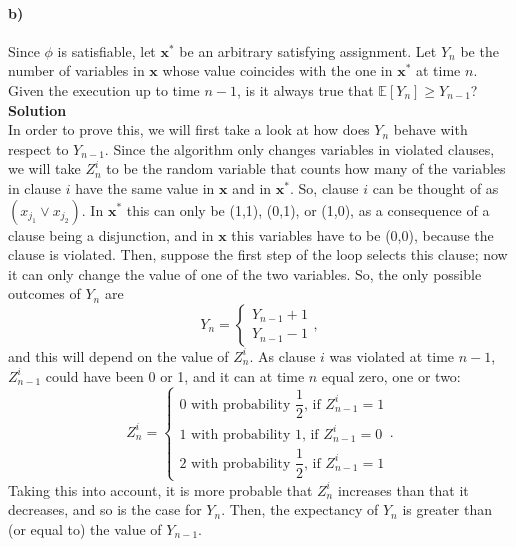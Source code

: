 \documentclass[10pt]{article}
\begin{document}
\paragraph{b)} Since $\phi$ is satisfiable, let $\textbf{x}^*$ be an arbitrary satisfying assignment. Let $Y_n$ be the number of variables in $\textbf{x}$ whose value coincides with the one in $\textbf{x}^*$ at time $n$. Given the execution up to time $n-1$, is it always true that $\mathbb{E}\left[Y_n\right]\geq Y_{n-1}$?\\
\textbf{Solution}\\
In order to prove this, we will first take a look at how does $Y_n$ behave with respect to $Y_{n-1}$. Since the algorithm only changes variables in violated clauses, we will take $Z^i_n$ to be the random variable that counts how many of the variables in clause $i$ have the same value in $\textbf{x}$ and in $\textbf{x}^*$. So, clause $i$ can be thought of as $(x_{j_1}\vee x_{j_2})$. In $\textbf{x}^*$ this can only be (1,1), (0,1), or (1,0), as a consequence of a clause being a disjunction, and in $\textbf{x}$ this variables have to be (0,0), because the clause is violated. Then, suppose the first step of the loop selects this clause; now it can only change the value of one of the two variables. So, the only possible outcomes of $Y_n$ are 
\[
Y_n=\begin{cases}
Y_{n-1}+1\\
Y_{n-1}-1
\end{cases},
\] and this will depend on the value of $Z^i_n$. As clause $i$ was violated at time $n-1$, $Z^i_{n-1}$ could have been 0 or 1, and it can at time $n$ equal zero, one or two:
\[
Z^i_n=\begin{cases}
0\text{ with probability }\dfrac{1}{2}\text{, if }Z^i_{n-1}=1\\
1\text{ with probability 1, if }Z^i_{n-1}=0\\
2\text{ with probability }\dfrac{1}{2}\text{, if }Z^i_{n-1}=1
\end{cases}.
\] Taking this into account, it is more probable that $Z^i_n$ increases than that it decreases, and so is the case for $Y_n$. Then, the expectancy of $Y_n$ is greater than (or equal to) the value of $Y_{n-1}$.
\end{document}
